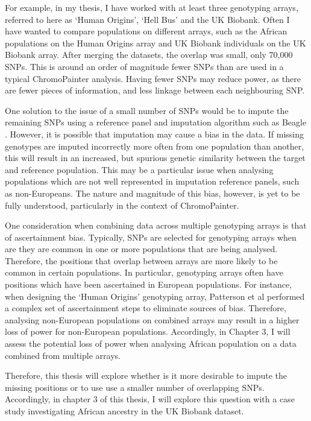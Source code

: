 For example, in my thesis, I have worked with at least three genotyping arrays, referred to here as `Human Origins', `Hell Bus' and the UK Biobank. Often I have wanted to compare populations on different arrays, such as the African populations on the Human Origins array and UK Biobank individuals on the UK Biobank array. After merging the datasets, the overlap was small, only 70,000 SNPs. This is around an order of magnitude fewer SNPs than are used in a typical ChromoPainter analysis. Having fewer SNPs may reduce power, as there are fewer pieces of information, and less linkage between each neighbouring SNP.

One solution to the issue of a small number of SNPs would be to impute the remaining SNPs using a reference panel and imputation algorithm such as Beagle \cite{Browning2016}. However, it is possible that imputation may cause a bias in the data. If missing genotypes are imputed incorrectly more often from one population than another, this will result in an increased, but spurious genetic similarity between the target and reference population. This may be a particular issue when analysing populations which are not well represented in imputation reference panels, such as non-Europeans. The nature and magnitude of this bias, however, is yet to be fully understood, particularly in the context of ChromoPainter.  

One consideration when combining data across multiple genotyping arrays is that of ascertainment bias. Typically, SNPs are selected for genotyping arrays when are they are common in one or more populations that are being analysed. Therefore, the positions that overlap between arrays are more likely to be common in certain populations. In particular, genotyping arrays often have positions which have been ascertained in European populations. For instance, when designing the `Human Origins' genotyping array, Patterson et al \cite{Patterson2012} performed a complex set of ascertainment steps to eliminate sources of bias. Therefore, analysing non-European populations on    combined arrays may result in a higher loss of power for non-European populations. Accordingly, in Chapter 3, I will assess the potential loss of power when analysing African population on a data combined from multiple arrays. 


Therefore, this thesis will explore whether is it more desirable to impute the missing positions or to use use a smaller number of overlapping SNPs. Accordingly, in chapter 3 of this thesis, I will explore this question with a case study investigating African ancestry in the UK Biobank dataset. 
 
